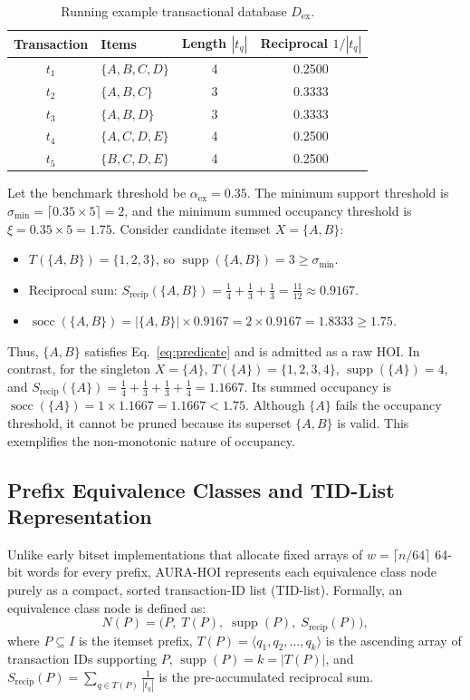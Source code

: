 \documentclass[runningheads,orivec]{llncs}
\newcommand{\supp}{\operatorname{supp}}
\newcommand{\socc}{\operatorname{socc}}
\newcommand{\AURA}{\textsc{AURA-HOI}}
\begin{document}
\begin{table}[ht]
\centering
\caption{Running example transactional database $D_{\mathrm{ex}}$.}
\label{tab:running-example}
\begin{tabular}{clcc}
\toprule
Transaction & Items & Length $|t_q|$ & Reciprocal $1/|t_q|$ \\
\midrule
$t_1$ & $\{A, B, C, D\}$ & 4 & 0.2500 \\
$t_2$ & $\{A, B, C\}$    & 3 & 0.3333 \\
$t_3$ & $\{A, B, D\}$    & 3 & 0.3333 \\
$t_4$ & $\{A, C, D, E\}$ & 4 & 0.2500 \\
$t_5$ & $\{B, C, D, E\}$ & 4 & 0.2500 \\
\bottomrule
\end{tabular}
\end{table}

Let the benchmark threshold be $\alpha_{\mathrm{ex}} = 0.35$. The minimum support threshold is $\sigma_{\min} = \lceil 0.35 \times 5 \rceil = 2$, and the minimum summed occupancy threshold is $\xi = 0.35 \times 5 = 1.75$.
Consider candidate itemset $X = \{A, B\}$:
\begin{itemize}
    \item $T(\{A, B\}) = \{1, 2, 3\}$, so $\supp(\{A, B\}) = 3 \ge \sigma_{\min}$.
    \item Reciprocal sum: $S_{\mathrm{recip}}(\{A, B\}) = \frac{1}{4} + \frac{1}{3} + \frac{1}{3} = \frac{11}{12} \approx 0.9167$.
    \item $\socc(\{A, B\}) = |\{A, B\}| \times 0.9167 = 2 \times 0.9167 = 1.8333 \ge 1.75$.
\end{itemize}
Thus, $\{A, B\}$ satisfies Eq.~\eqref{eq:predicate} and is admitted as a raw HOI. In contrast, for the singleton $X = \{A\}$, $T(\{A\}) = \{1, 2, 3, 4\}$, $\supp(\{A\}) = 4$, and $S_{\mathrm{recip}}(\{A\}) = \frac{1}{4} + \frac{1}{3} + \frac{1}{3} + \frac{1}{4} = 1.1667$. Its summed occupancy is $\socc(\{A\}) = 1 \times 1.1667 = 1.1667 < 1.75$. Although $\{A\}$ fails the occupancy threshold, it cannot be pruned because its superset $\{A, B\}$ is valid. This exemplifies the non-monotonic nature of occupancy.

\subsection{Prefix Equivalence Classes and TID-List Representation}

Unlike early bitset implementations that allocate fixed arrays of $w = \lceil n/64 \rceil$ 64-bit words for every prefix, \AURA{} represents each equivalence class node purely as a compact, sorted transaction-ID list (TID-list). Formally, an equivalence class node is defined as:
\begin{equation}
N(P) = \Big( P, \; T(P), \; \supp(P), \; S_{\mathrm{recip}}(P) \Big),
\end{equation}
where $P \subseteq I$ is the itemset prefix, $T(P) = \langle q_1, q_2, \dots, q_k \rangle$ is the ascending array of transaction IDs supporting $P$, $\supp(P) = k = |T(P)|$, and $S_{\mathrm{recip}}(P) = \sum_{q \in T(P)} \frac{1}{|t_q|}$ is the pre-accumulated reciprocal sum.
\end{document}
